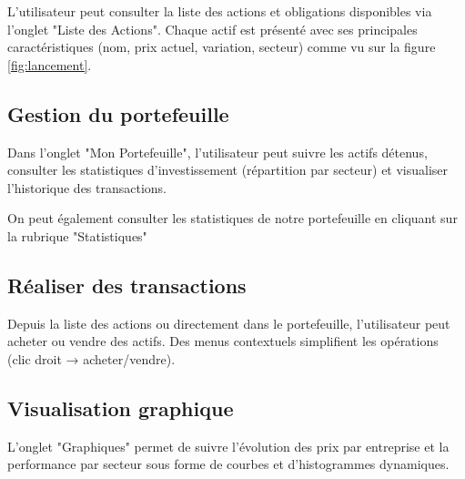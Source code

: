 L’utilisateur peut consulter la liste des actions et obligations disponibles via l’onglet "Liste des Actions".  
Chaque actif est présenté avec ses principales caractéristiques (nom, prix actuel, variation, secteur) comme vu sur la figure \ref{fig:lancement}.


\vspace{0.5cm}
\subsection{Gestion du portefeuille}

Dans l’onglet "Mon Portefeuille", l’utilisateur peut suivre les actifs détenus, consulter les statistiques d’investissement (répartition par secteur) et visualiser l’historique des transactions.


On peut également consulter les statistiques de notre portefeuille en cliquant sur la rubrique "Statistiques" 




\vspace{3.5cm}
\subsection{Réaliser des transactions}

Depuis la liste des actions ou directement dans le portefeuille, l'utilisateur peut acheter ou vendre des actifs.  
Des menus contextuels simplifient les opérations (clic droit → acheter/vendre).




\vspace{0.5cm}
\subsection{Visualisation graphique}

L’onglet "Graphiques" permet de suivre l'évolution des prix par entreprise et la performance par secteur sous forme de courbes et d’histogrammes dynamiques.

